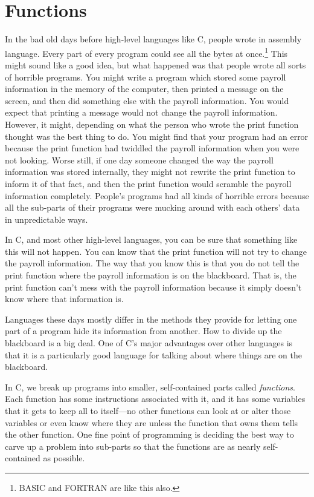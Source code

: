 %
%
%


\section{Functions}

    In the bad old days before high-level languages like C, people wrote
in assembly language.  Every part of every program could see all the
bytes at once.\footnote{BASIC and FORTRAN are like this also.} This
might sound like a good idea, but what happened was that people wrote
all sorts of horrible programs.  You might write a program which stored
some payroll information in the memory of the computer, then printed a
message on the screen, and then did something else with the payroll
information.  You would expect that printing a message would not change
the payroll information.  However, it might, depending on what the
person who wrote the print function thought was the best thing to do.
You might find that your program had an error because the print function
had twiddled the payroll information when you were not looking.  Worse
still, if one day someone changed the way the payroll information was
stored internally, they might not rewrite the print function to inform
it of that fact, and then the print function would scramble the payroll
information completely.  People's programs had all kinds of horrible
errors because all the sub-parts of their programs were mucking around
with each others' data in unpredictable ways.

    In C, and most other high-level languages, you can be sure that
something like this will not happen. You can know that the print
function will not try to change the payroll information.  The way that
you know this is that you do not tell the print function where the
payroll information is on the blackboard.  That is, the print function
can't mess with the payroll information because it simply doesn't know
where that information is.

    Languages these days mostly differ in the methods they provide for
letting one part of a program hide its information from another.  How to
divide up the blackboard is a big deal.  One of C's major advantages
over other languages is that it is a particularly good language for
talking about where things are on the blackboard.

    In C, we break up programs into smaller, self-contained parts called
{\em functions}.  Each function has some instructions associated with
it, and it has some variables that it gets to keep all to itself---no
other functions can look at or alter those variables or even know where
they are unless the function that owns them tells the other function.
One fine point of programming is deciding the best way to carve up a
problem into sub-parts so that the functions are as nearly
self-contained as possible.

